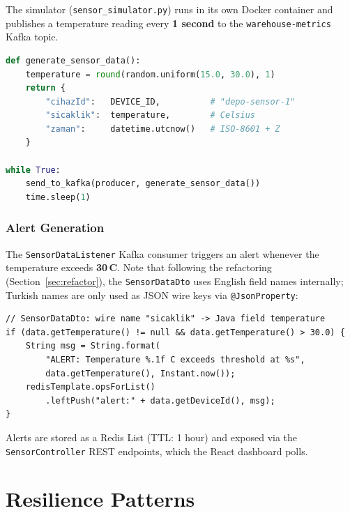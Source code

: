 \documentclass[12pt,a4paper,twoside]{article}
\begin{document}
The simulator (\texttt{sensor\_simulator.py}) runs in its own Docker
container and publishes a temperature reading every \textbf{1 second}
to the \texttt{warehouse-metrics} Kafka topic.

\begin{lstlisting}[style=javaStyle, language=Python,
  caption={Core simulation loop (Python)}]
def generate_sensor_data():
    temperature = round(random.uniform(15.0, 30.0), 1)
    return {
        "cihazId":   DEVICE_ID,          # "depo-sensor-1"
        "sicaklik":  temperature,        # Celsius
        "zaman":     datetime.utcnow()   # ISO-8601 + Z
    }

while True:
    send_to_kafka(producer, generate_sensor_data())
    time.sleep(1)
\end{lstlisting}

\subsubsection{Alert Generation}

The \texttt{SensorDataListener} Kafka consumer triggers an alert
whenever the temperature exceeds \textbf{30\,\textdegree{}C}.
Note that following the refactoring (Section~\ref{sec:refactor}), the
\texttt{SensorDataDto} uses English field names internally; Turkish names
are only used as JSON wire keys via \texttt{@JsonProperty}:

\begin{lstlisting}[style=javaStyle,
  caption={Temperature alert logic using English field names}]
// SensorDataDto: wire name "sicaklik" -> Java field temperature
if (data.getTemperature() != null && data.getTemperature() > 30.0) {
    String msg = String.format(
        "ALERT: Temperature %.1f C exceeds threshold at %s",
        data.getTemperature(), Instant.now());
    redisTemplate.opsForList()
        .leftPush("alert:" + data.getDeviceId(), msg);
}
\end{lstlisting}

Alerts are stored as a Redis List (TTL: 1 hour) and exposed via the
\texttt{SensorController} REST endpoints, which the React dashboard polls.

\section{Resilience Patterns}
\label{sec:resilience}
\end{document}
